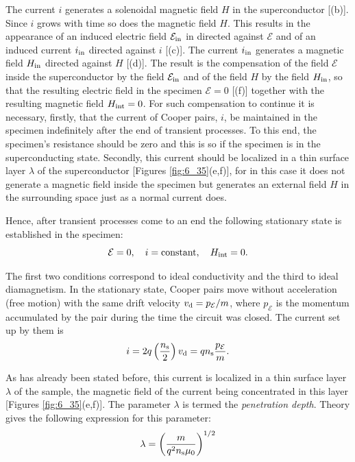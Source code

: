 The current $i$ generates a solenoidal magnetic field $H$ in the superconductor [(b)]. Since $i$ grows with time so does the magnetic field $H$. This results in the appearance of an induced electric field $\mathcal{E}_{\text{in}}$ in directed against $\mathcal{E}$ and of an induced current $i_{\text{in}}$ directed against $i$ [(c)]. The current $i_{\text{in}}$ generates a magnetic field $H_{\text{in}}$ directed against $H$ [(d)]. The result is the compensation
of the field $\mathcal{E}$ inside the superconductor by the field $\mathcal{E}_{\text{in}}$ and of the field $H$ by the field $H_{\text{in}}$, so that the resulting electric field in the specimen $\mathcal{E}=0$ [(f)] together with the resulting magnetic field $H_{\text{int}}=0$. For such compensation to continue it is necessary, firstly, that the current of Cooper pairs, $i$, be maintained
in the specimen indefinitely after the end of transient processes. To this end, the specimen's resistance should be zero and this is so if the specimen is in the superconducting state. Secondly, this current should be localized in a thin surface layer $\lambda$ of the superconductor [Figures \ref{fig:6_35}(e,f)], for in this case it does not generate a magnetic field inside the specimen but generates an external field $H$ in the surrounding space just as a normal current does.

Hence, after transient processes come to an end the following stationary state is established in the specimen:
\begin{equation*}
	\mathcal{E}=0,\quad i=\text{constant},\quad H_{\text{int}}=0.
\end{equation*}

\noindent
The first two conditions correspond to ideal conductivity and the third to ideal diamagnetism. In the stationary state, Cooper pairs move without acceleration (free motion) with the same drift velocity $v_{\text{d}}=p_{\mathcal{E}}/m$, where $p_{\mathcal{E}}$ is the momentum accumulated by the pair during the time the circuit was closed. The current set up by them is
\begin{equation*}
	i = 2q \left(\frac{n_{\text{s}}}{2}\right) v_{\text{d}} = q n_{\text{s}} \frac{p_{\mathcal{E}}}{m}.
\end{equation*}

\noindent
As has already been stated before, this current is localized in a thin surface layer $\lambda$ of the sample, the magnetic field of the current being concentrated in this layer [Figures \ref{fig:6_35}(e,f)]. The parameter $\lambda$ is
termed the \textit{penetration depth}. Theory gives the following expression for this parameter:
\begin{equation}\label{eq:6_54}
	\lambda = \left(\frac{m}{q^2 n_{\text{s}} \mu_0}\right)^{1/2}
\end{equation}


